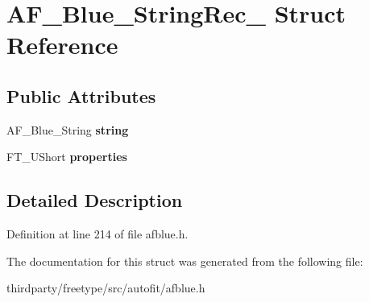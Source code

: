 \hypertarget{struct_a_f___blue___string_rec__}{}\section{A\+F\+\_\+\+Blue\+\_\+\+String\+Rec\+\_\+ Struct Reference}
\label{struct_a_f___blue___string_rec__}
\subsection*{Public Attributes}
\begin{DoxyCompactItemize}
\item 
\mbox{\label{struct_a_f___blue___string_rec___a97e07eb3c137d3e18a79f0c8557040f2}} 
A\+F\+\_\+\+Blue\+\_\+\+String {\bfseries string}
\item 
\mbox{\label{struct_a_f___blue___string_rec___aab7662c2a80a439ef052a7a71c4d9e3f}} 
F\+T\+\_\+\+U\+Short {\bfseries properties}
\end{DoxyCompactItemize}


\subsection{Detailed Description}


Definition at line 214 of file afblue.\+h.



The documentation for this struct was generated from the following file\+:\begin{DoxyCompactItemize}
\item 
thirdparty/freetype/src/autofit/afblue.\+h\end{DoxyCompactItemize}

